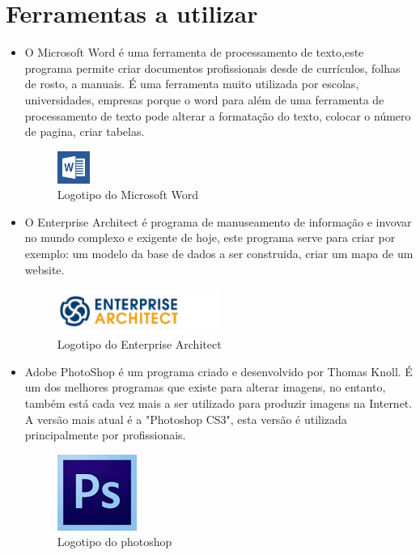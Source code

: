 \documentclass[11pt]{report}
\begin{document}
\section{Ferramentas a utilizar}
\begin{itemize}
\item O Microsoft Word é uma ferramenta de processamento de texto,este programa permite criar documentos profissionais desde de currículos, folhas de rosto, a manuais. 
É uma ferramenta muito utilizada por escolas, universidades, empresas porque o word para além de uma ferramenta de processamento de texto pode alterar a formatação do texto, colocar o número de pagina, criar tabelas.
\begin{figure}
\centering
\includegraphics[width=0.1\textwidth]{word_logo.png}
\caption{Logotipo do Microsoft Word}
\end{figure}

\item O Enterprise Architect é programa de manuseamento de informação e invovar no mundo complexo e exigente de hoje, este programa serve para criar por exemplo: um modelo da base de dados a ser construida, criar um mapa de um website.
\begin{figure}
\centering
\includegraphics[width=0.5\textwidth]{Enterprise_Architect.png}
\caption{Logotipo do Enterprise Architect}
\end{figure}

\item Adobe PhotoShop é um programa criado e desenvolvido por Thomas Knoll.
É um dos melhores programas que existe para alterar imagens, no entanto, também está cada vez mais a ser utilizado para produzir imagens na Internet. A versão mais atual é a "Photoshop CS3", esta versão é utilizada principalmente por profissionais.
\begin{figure}
\centering
\includegraphics{Photoshop.jpg}
\caption{Logotipo do photoshop}
\end{figure}


\end{itemize}
\end{document}
